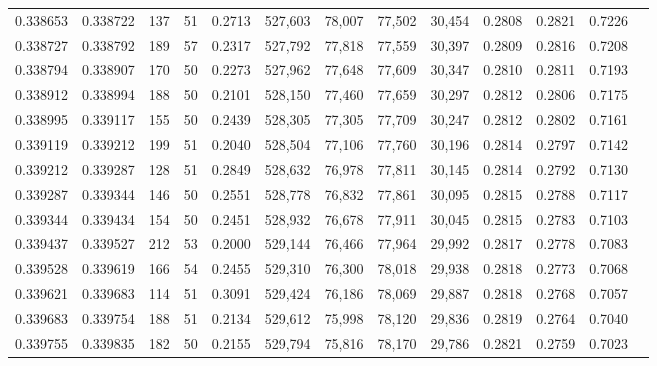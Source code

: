 \begin{tabular}{rrrrrrrrrrrrr}
0.338653 & 0.338722 &   137 &  51 &                                     0.2713 & 527,603 &  78,007 &  77,502 &  30,454 & 0.2808 & 0.2821 & 0.7226 \\
0.338727 & 0.338792 &   189 &  57 &                                     0.2317 & 527,792 &  77,818 &  77,559 &  30,397 & 0.2809 & 0.2816 & 0.7208 \\
0.338794 & 0.338907 &   170 &  50 &                                     0.2273 & 527,962 &  77,648 &  77,609 &  30,347 & 0.2810 & 0.2811 & 0.7193 \\
0.338912 & 0.338994 &   188 &  50 &                                     0.2101 & 528,150 &  77,460 &  77,659 &  30,297 & 0.2812 & 0.2806 & 0.7175 \\
0.338995 & 0.339117 &   155 &  50 &                                     0.2439 & 528,305 &  77,305 &  77,709 &  30,247 & 0.2812 & 0.2802 & 0.7161 \\
0.339119 & 0.339212 &   199 &  51 &                                     0.2040 & 528,504 &  77,106 &  77,760 &  30,196 & 0.2814 & 0.2797 & 0.7142 \\
0.339212 & 0.339287 &   128 &  51 &                                     0.2849 & 528,632 &  76,978 &  77,811 &  30,145 & 0.2814 & 0.2792 & 0.7130 \\
0.339287 & 0.339344 &   146 &  50 &                                     0.2551 & 528,778 &  76,832 &  77,861 &  30,095 & 0.2815 & 0.2788 & 0.7117 \\
0.339344 & 0.339434 &   154 &  50 &                                     0.2451 & 528,932 &  76,678 &  77,911 &  30,045 & 0.2815 & 0.2783 & 0.7103 \\
0.339437 & 0.339527 &   212 &  53 &                                     0.2000 & 529,144 &  76,466 &  77,964 &  29,992 & 0.2817 & 0.2778 & 0.7083 \\
0.339528 & 0.339619 &   166 &  54 &                                     0.2455 & 529,310 &  76,300 &  78,018 &  29,938 & 0.2818 & 0.2773 & 0.7068 \\
0.339621 & 0.339683 &   114 &  51 &                                     0.3091 & 529,424 &  76,186 &  78,069 &  29,887 & 0.2818 & 0.2768 & 0.7057 \\
0.339683 & 0.339754 &   188 &  51 &                                     0.2134 & 529,612 &  75,998 &  78,120 &  29,836 & 0.2819 & 0.2764 & 0.7040 \\
0.339755 & 0.339835 &   182 &  50 &                                     0.2155 & 529,794 &  75,816 &  78,170 &  29,786 & 0.2821 & 0.2759 & 0.7023 \\

\end{tabular}
